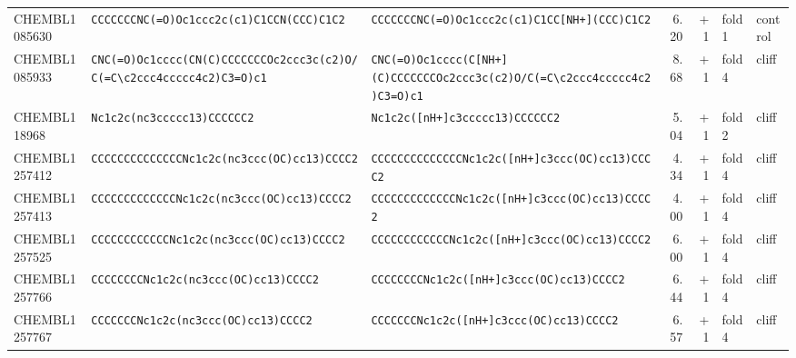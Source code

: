 \begin{longtable}{l p{4.4cm} p{4.4cm} r r l l}
CHEMBL1085630 & \texttt{CCCCCCCNC(\allowbreak{}=\allowbreak{}O)\allowbreak{}Oc1ccc2c(\allowbreak{}c1)\allowbreak{}C1CCN(\allowbreak{}CCC)\allowbreak{}C1C2} & \texttt{CCCCCCCNC(\allowbreak{}=\allowbreak{}O)\allowbreak{}Oc1ccc2c(\allowbreak{}c1)\allowbreak{}C1CC[NH+]\allowbreak{}(\allowbreak{}CCC)\allowbreak{}C1C2} & 6.20 & +1 & fold 1 & control \\
CHEMBL1085933 & \texttt{CNC(\allowbreak{}=\allowbreak{}O)\allowbreak{}Oc1cccc(\allowbreak{}CN(\allowbreak{}C)\allowbreak{}CCCCCCCOc2ccc3c(\allowbreak{}c2)\allowbreak{}O/\allowbreak{}C(\allowbreak{}=\allowbreak{}C\textbackslash{}c2ccc4ccccc4c2)\allowbreak{}C3=\allowbreak{}O)\allowbreak{}c1} & \texttt{CNC(\allowbreak{}=\allowbreak{}O)\allowbreak{}Oc1cccc(\allowbreak{}C[NH+]\allowbreak{}(\allowbreak{}C)\allowbreak{}CCCCCCCOc2ccc3c(\allowbreak{}c2)\allowbreak{}O/\allowbreak{}C(\allowbreak{}=\allowbreak{}C\textbackslash{}c2ccc4ccccc4c2)\allowbreak{}C3=\allowbreak{}O)\allowbreak{}c1} & 8.68 & +1 & fold 4 & cliff \\
CHEMBL118968 & \texttt{Nc1c2c(\allowbreak{}nc3ccccc13)\allowbreak{}CCCCCC2} & \texttt{Nc1c2c(\allowbreak{}[nH+]\allowbreak{}c3ccccc13)\allowbreak{}CCCCCC2} & 5.04 & +1 & fold 2 & cliff \\
CHEMBL1257412 & \texttt{CCCCCCCCCCCCCCNc1c2c(\allowbreak{}nc3ccc(\allowbreak{}OC)\allowbreak{}cc13)\allowbreak{}CCCC2} & \texttt{CCCCCCCCCCCCCCNc1c2c(\allowbreak{}[nH+]\allowbreak{}c3ccc(\allowbreak{}OC)\allowbreak{}cc13)\allowbreak{}CCCC2} & 4.34 & +1 & fold 4 & cliff \\
CHEMBL1257413 & \texttt{CCCCCCCCCCCCCNc1c2c(\allowbreak{}nc3ccc(\allowbreak{}OC)\allowbreak{}cc13)\allowbreak{}CCCC2} & \texttt{CCCCCCCCCCCCCNc1c2c(\allowbreak{}[nH+]\allowbreak{}c3ccc(\allowbreak{}OC)\allowbreak{}cc13)\allowbreak{}CCCC2} & 4.00 & +1 & fold 4 & cliff \\
CHEMBL1257525 & \texttt{CCCCCCCCCCCCNc1c2c(\allowbreak{}nc3ccc(\allowbreak{}OC)\allowbreak{}cc13)\allowbreak{}CCCC2} & \texttt{CCCCCCCCCCCCNc1c2c(\allowbreak{}[nH+]\allowbreak{}c3ccc(\allowbreak{}OC)\allowbreak{}cc13)\allowbreak{}CCCC2} & 6.00 & +1 & fold 4 & cliff \\
CHEMBL1257766 & \texttt{CCCCCCCCNc1c2c(\allowbreak{}nc3ccc(\allowbreak{}OC)\allowbreak{}cc13)\allowbreak{}CCCC2} & \texttt{CCCCCCCCNc1c2c(\allowbreak{}[nH+]\allowbreak{}c3ccc(\allowbreak{}OC)\allowbreak{}cc13)\allowbreak{}CCCC2} & 6.44 & +1 & fold 4 & cliff \\
CHEMBL1257767 & \texttt{CCCCCCCNc1c2c(\allowbreak{}nc3ccc(\allowbreak{}OC)\allowbreak{}cc13)\allowbreak{}CCCC2} & \texttt{CCCCCCCNc1c2c(\allowbreak{}[nH+]\allowbreak{}c3ccc(\allowbreak{}OC)\allowbreak{}cc13)\allowbreak{}CCCC2} & 6.57 & +1 & fold 4 & cliff \\

\end{longtable}
